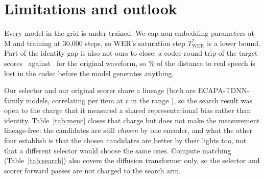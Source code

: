 \documentclass{article}
\begin{document}
\begin{table}[htbp]
  \centering\footnotesize
  \caption{\emph{The search result is not an artefact of the selector's lineage.} The same
  \NmencItems\ items per run, \NmencRuns\ runs, rescored end-to-end by five speaker encoders
  spanning four model families. The selector is WavLM-large SV, so its own row is circular
  and is shown only for reference. A \emph{per-item win rate} (how often an encoder ranks
  the search output above the refinement output at matched NFE) is invariant to any
  monotone rescaling of that encoder's cosine, which a difference of means is not; we
  therefore compare win rates across encoders and report each raw $\Delta$ only beside its own
  scale. Every family, including the three whose absolute cosines fail our ground-truth gate (median same-speaker cosine $\ge 0.50$, cross-speaker $\le 0.25$)
  \emph{purely on scale} while separating speakers at AUC $\ge \NmencMinAuc$, puts search
  ahead with an interval clear of one half.}
  
  \label{tab:menc}
\end{table}






\section{Limitations and outlook}
Every model in the grid is under-trained. We cap non-embedding parameters at \NmaxN\,M and
training at 30{,}000 steps, so WER's saturation step $T^{*}_{\mathrm{WER}}$ is a lower bound. Part of the identity
gap is also not ours to close: a codec round trip of the target scores \NsimRoundtrip\
against \NsimRealAudio\ for the original waveform, so \NcodecShare\% of the distance to real
speech is lost in the codec before the model generates anything.

Our selector and our original scorer share a lineage (both are ECAPA-TDNN-family models,
correlating per item at $r$ in the range \NselCorrRange), so the search result was open to
the charge that it measured a shared representational bias rather than identity.
Table~\ref{tab:menc} closes that charge but does not make the measurement lineage-free: the
candidates are still \emph{chosen} by one encoder, and what the other four establish is that
the chosen candidates are better by their lights too, not that a different selector would
choose the same ones. Compute matching (Table~\ref{tab:search}) also covers the diffusion transformer only, so the
selector and scorer forward passes are not charged to the search arm.
\end{document}
